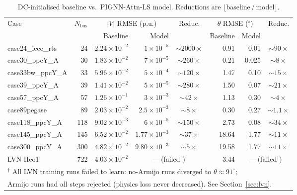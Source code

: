 \documentclass{article}
\begin{document}
\begin{table}[h]
\centering
\small
\caption{DC-initialised baseline vs.\ PIGNN-Attn-LS model.  Reductions are
  $\lfloor$baseline\,/\,model$\rfloor$.}
\label{tab:baseline_vs_model}
\setlength{\tabcolsep}{4pt}
\begin{tabular}{lrrrcrrc}
\toprule
\multirow{2}{*}{Case} & \multirow{2}{*}{$N_{\mathrm{bus}}$}
  & \multicolumn{2}{c}{$|V|$ RMSE (p.u.)} & \multirow{2}{*}{Reduc.}
  & \multicolumn{2}{c}{$\theta$ RMSE (${}^\circ$)} & \multirow{2}{*}{Reduc.} \\
\cmidrule(lr){3-4}\cmidrule(lr){6-7}
& & Baseline & Model & & Baseline & Model & \\
\midrule
case24\_ieee\_rts  & 24  & $2.24\times10^{-2}$ & $1\times10^{-5}$ & $\sim2000\times$ & 0.91  & 0.01 & $\sim90\times$ \\
case30\_ppcY\_A    & 30  & $1.83\times10^{-2}$ & $7\times10^{-5}$ & $\sim260\times$  & 0.21  & 0.025 & $\sim8\times$ \\
case33bw\_ppcY\_A  & 33  & $5.96\times10^{-2}$ & $5\times10^{-4}$ & $\sim120\times$  & 1.47  & 0.10  & $\sim15\times$ \\
case39\_ppcY\_A    & 39  & $1.41\times10^{-2}$ & $5\times10^{-5}$ & $\sim280\times$  & 1.50  & 0.07  & $\sim21\times$ \\
case57\_ppcY\_A    & 57  & $1.26\times10^{-1}$ & $3\times10^{-3}$ & $\sim42\times$   & 1.13  & 0.30  & $\sim4\times$ \\
case89pegase       & 89  & $2.03\times10^{-2}$ & $2.5\times10^{-3}$ & $\sim8\times$  & 0.30  & 0.27  & $\sim1.1\times$ \\
case118\_ppcY\_A   & 118 & $9.02\times10^{-3}$ & $6\times10^{-5}$ & $\sim150\times$  & 2.73  & 0.08  & $\sim34\times$ \\
case145\_ppcY\_A   & 145 & $6.52\times10^{-2}$ & $1.77\times10^{-3}$ & $\sim37\times$ & 18.64 & 1.77  & $\sim11\times$ \\
case300\_ppcY\_A   & 300 & $4.82\times10^{-2}$ & $9.80\times10^{-3}$ & $\sim5\times$ & 19.58 & 1.77  & $\sim11\times$ \\
LVN Heo1          & 722 & $4.03\times10^{-2}$ & \multicolumn{2}{c}{---\,(failed$^\dagger$)} & 3.44  & \multicolumn{2}{c}{---\,(failed$^\dagger$)} \\
\bottomrule
\multicolumn{8}{l}{${}^\dagger$ All LVN training runs failed to learn: no-Armijo runs diverged to $\theta\!\approx\!91^\circ$;}\\
\multicolumn{8}{l}{\phantom{${}^\dagger$} Armijo runs had all steps rejected (physics loss never decreased). See Section~\ref{sec:lvn}.}\\
\end{tabular}
\end{table}
\end{document}
